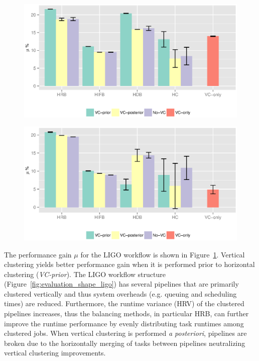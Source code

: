 \begin{figure}[!htb]
	\centering
	\includegraphics[width=1.0\linewidth]{figure26.eps}
	\label{fig:evaluation_vc_ligo}
\end{figure}


\begin{figure}[!htb]
	\centering
	\includegraphics[width=1.0\linewidth]{figure27.eps}
	\label{fig:evaluation_vc_genome}
\end{figure}

The performance gain $\mu$ for the LIGO workflow is shown in Figure~\ref{fig:evaluation_vc_ligo}. Vertical clustering yields better performance gain when it is performed prior to horizontal clustering (\emph{VC-prior}). The LIGO workflow structure (Figure~\ref{fig:evaluation_shape_ligo}) has several pipelines that are primarily clustered vertically and thus system overheads (e.g. queuing and scheduling times) are reduced. Furthermore, the runtime variance (HRV) of the clustered pipelines increases, thus the balancing methods, in particular HRB, can further improve the runtime performance by evenly distributing task runtimes among clustered jobs. When vertical clustering is performed \emph{a posteriori}, pipelines are broken due to the horizontally merging of tasks between pipelines neutralizing vertical clustering improvements.





